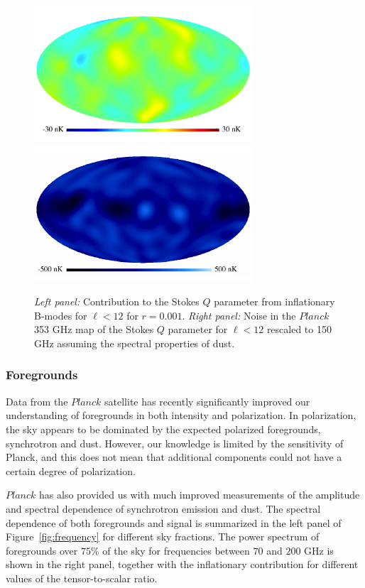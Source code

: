 \begin{figure}[h]
\begin{center}
\includegraphics[width=3.2in]{Figures/P15_2_12_rp001.pdf}
\includegraphics[width=3.2in]{Figures/P353_N_2_12.pdf}
\end{center}
\caption{{\it Left panel:} Contribution to the Stokes $Q$ parameter from inflationary B-modes for $\ell<12$ for $r=0.001$. {\it Right panel:} Noise in the $Planck$ 353 GHz map of the Stokes $Q$ parameter for $\ell<12$ rescaled to 150 GHz assuming the spectral properties of dust.}
\label{fig:Qrp001}
\end{figure}
\subsubsection{Foregrounds}
Data from the $Planck$ satellite has recently significantly improved our understanding of foregrounds in both intensity and polarization. 
In polarization, the sky appears to be dominated by the expected polarized foregrounds, synchrotron and dust. However, our knowledge is limited by the sensitivity of Planck, and this does not mean that additional components could not have a certain degree of polarization. 

$Planck$ has also provided us with much improved measurements of the amplitude and spectral dependence of synchrotron emission and dust. The spectral dependence of both foregrounds and signal is summarized in the left panel of Figure~\ref{fig:frequency} for different sky fractions. The power spectrum of foregrounds over $75\%$ of the sky for frequencies between $70$ and $200$ GHz is shown in the right panel, together with the inflationary contribution for different values of the tensor-to-scalar ratio.

